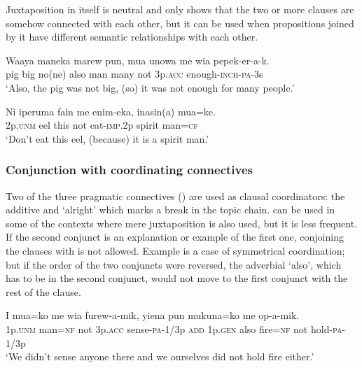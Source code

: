 Juxtaposition in itself is neutral and only shows that the two or more clauses are somehow connected with each other, but it can be used when propositions joined by it have different semantic relationships with each other.

\ea%
\label{ex:8:x1404}
\gll Waaya  maneka  marew  pun,  mua  unowa  me  wia pepek-er-a-k.\\
 pig  big  no(ne)  also  man  many  not  3p.\textsc{acc} enough-\textsc{inch}-\textsc{pa}-3s\\
\glt`Also, the pig was not big, (so) it was not enough for many people.'
\z


\ea%
\label{ex:8:x1425}
\gll Ni  iperuma  fain  me  enim-eka,  inasin(a)  mua=ke. \\
2p.\textsc{unm}  eel  this  not  eat-\textsc{imp}.2p  spirit  man=\textsc{cf}      \\
\glt`Don't eat this eel, (because) it is a spirit man.'
\z


\subsubsection{Conjunction with coordinating connectives} \label{sec:8.1.1.2}

Two of the three pragmatic connectives () are used as clausal coordinators: the additive   and  `alright' which marks a break in the topic chain.  can be used in some of the contexts where mere juxtaposition is also used, but it is less frequent. If the second conjunct is an explanation or example of the first one, conjoining the clauses with  is not allowed. Example  is a case of symmetrical coordination; but if the order of the two conjuncts were reversed, the adverbial  `also', which has to be in the second conjunct, would not move to the first conjunct with the rest of the clause.

\ea%
\label{ex:8:x1372}
\gll I  mua=ko  me  wia  furew-a-mik,    yiena  pun  mukuna=ko  me  op-a-mik.\\
1p.\textsc{unm}  man=\textsc{nf}  not  3p.\textsc{acc}  sense-\textsc{pa}-1/3p  \textsc{add}  1p.\textsc{gen}  also fire=\textsc{nf}  not  hold-\textsc{pa}-1/3p    \\
\glt`We didn't sense anyone there and we ourselves did not hold fire either.'
\z


